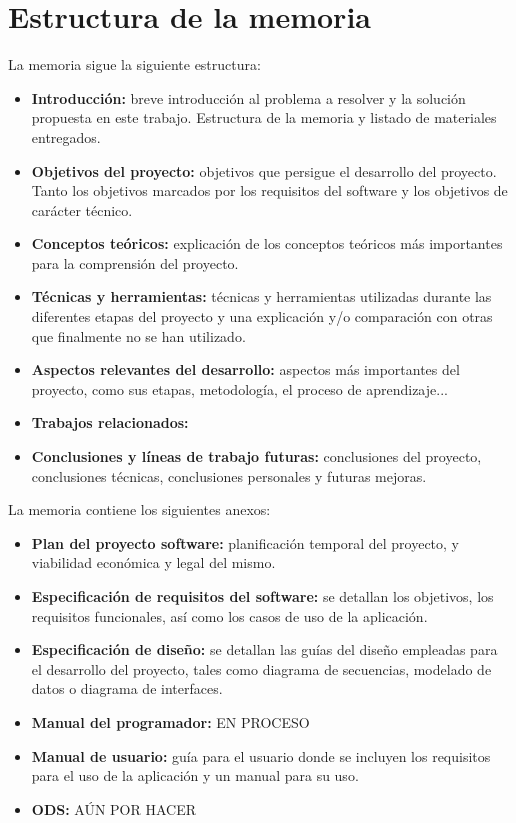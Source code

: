 \section{Estructura de la memoria}\label{estructura-de-la-memoria}

La memoria sigue la siguiente estructura:

\begin{itemize}
\tightlist
\item
  \textbf{Introducción:} breve introducción al problema a resolver y la
  solución propuesta en este trabajo. Estructura de la memoria y listado de materiales
  entregados.
\item
  \textbf{Objetivos del proyecto:} objetivos que
  persigue el desarrollo del proyecto. Tanto los objetivos marcados por los requisitos del software y los objetivos de carácter técnico.
\item
  \textbf{Conceptos teóricos:} explicación de los conceptos teóricos más importantes para la comprensión del proyecto.
\item
  \textbf{Técnicas y herramientas:} técnicas y herramientas utilizadas durante las diferentes etapas del proyecto y una explicación y/o comparación con otras que finalmente no se han utilizado.
\item
  \textbf{Aspectos relevantes del desarrollo:} aspectos más importantes del proyecto, como sus etapas, metodología, el proceso de aprendizaje...
\item
  \textbf{Trabajos relacionados:} 
\item
  \textbf{Conclusiones y líneas de trabajo futuras:} conclusiones del proyecto, conclusiones técnicas, conclusiones personales y futuras mejoras.
\end{itemize}

La memoria contiene los siguientes anexos:

\begin{itemize}
\tightlist
\item
  \textbf{Plan del proyecto software:} planificación temporal del proyecto, y viabilidad económica y legal del mismo.
\item
  \textbf{Especificación de requisitos del software:} se detallan los objetivos, los requisitos funcionales, así como los casos de uso de la aplicación.
\item
  \textbf{Especificación de diseño:} se detallan las guías del diseño empleadas para el desarrollo del proyecto, tales como diagrama de secuencias, modelado de datos o diagrama de interfaces.
\item
  \textbf{Manual del programador:} EN PROCESO
\item
  \textbf{Manual de usuario:} guía para el usuario donde se incluyen los requisitos para el uso de la aplicación y un manual para su uso.
\item
  \textbf{ODS:} AÚN POR HACER
\end{itemize}





